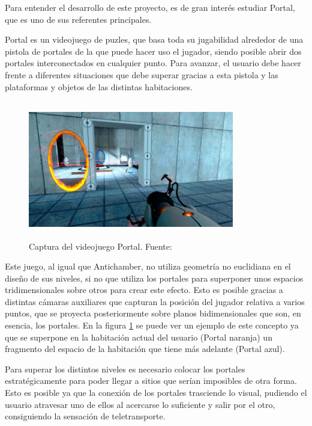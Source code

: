 \documentclass[../main.tex]{subfiles}
\begin{document}
Para entender el desarrollo de este proyecto, es de gran interés estudiar Portal, que es uno de sus referentes principales.

Portal es un videojuego de puzles, que basa toda su jugabilidad alrededor de una pistola de portales de la que puede hacer uso el jugador, siendo posible abrir dos portales interconectados en cualquier punto. Para avanzar, el usuario debe hacer frente a diferentes situaciones que debe superar gracias a esta pistola y las plataformas y objetos de las distintas habitaciones.

\begin{figure}[htbp]
\centering
\includegraphics[width= 9cm, height= 6cm]{imagenes/Portal_Game_3D.jpg}
\caption{Captura del videojuego Portal. Fuente:\cite{Portal_Game_3D}}
\label{fig:Portal_Game_3D}
\end{figure}

Este juego, al igual que Antichamber, no utiliza geometría no euclidiana en el diseño de sus niveles, si no que utiliza los portales para superponer unos espacios tridimensionales sobre otros para crear este efecto. Esto es posible gracias a distintas cámaras auxiliares que capturan la posición del jugador relativa a varios puntos, que se proyecta posteriormente sobre planos bidimensionales que son, en esencia, los portales. En la figura \ref{fig:Portal_Game_3D} se puede ver un ejemplo de este concepto ya que se superpone en la habitación actual del usuario (Portal naranja) un fragmento del espacio de la habitación que tiene más adelante (Portal azul).

Para superar los distintos niveles es necesario colocar los portales estratégicamente para poder llegar a sitios que serían imposibles de otra forma. Esto es posible ya que la conexión de los portales trasciende lo visual, pudiendo el usuario atravesar uno de ellos al acercarse lo suficiente y salir por el otro, consiguiendo la sensación de teletransporte.
\end{document}
